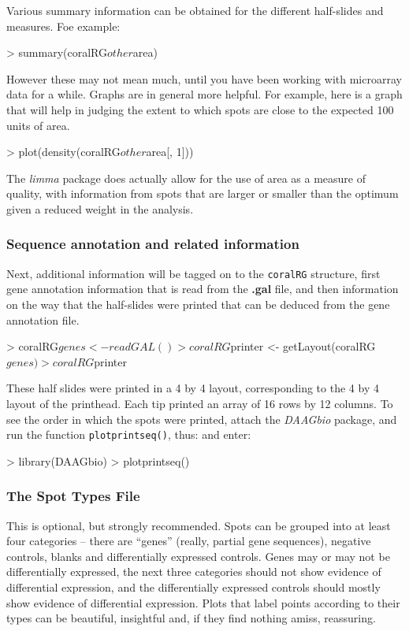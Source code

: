 \documentclass[a4paper,9pt]{article}
\begin{document}
Various summary information can be obtained for the different half-slides and
measures.  Foe example:
\begin{Schunk}
\begin{Sinput}
> summary(coralRG$other$area)
\end{Sinput}
\end{Schunk}
However these may not mean much, until you have been working with
microarray data for a while.  Graphs are in general more helpful.
For example, here is a graph that will help in judging the extent to
which spots are close to the expected 100 units of area.
\begin{Schunk}
\begin{Sinput}
> plot(density(coralRG$other$area[, 1]))
\end{Sinput}
\end{Schunk}
The \textit{limma} package does actually allow for the use of area
as a measure of quality, with information from spots that are larger
or smaller than the optimum given a reduced weight in the analysis.

\subsubsection*{Sequence annotation and related information}

Next, additional information will be tagged on to the \texttt{coralRG}
structure, first gene annotation information that is read from the
\textbf{.gal} file, and then information on the way that the
half-slides were printed that can be deduced from the gene annotation file.
\begin{Schunk}
\begin{Sinput}
> coralRG$genes <- readGAL()
> coralRG$printer <- getLayout(coralRG$genes)
> coralRG$printer
\end{Sinput}
\end{Schunk}
These half slides were printed in a 4 by 4 layout, corresponding to the
4 by 4 layout of the printhead.  Each tip printed an array of 16 rows
by 12 columns.  To see the order in which the spots were printed,
attach the \textit{DAAGbio} package, and run the function 
\texttt{plotprintseq()}, thus:
and enter:
\begin{Schunk}
\begin{Sinput}
> library(DAAGbio)
> plotprintseq()
\end{Sinput}
\end{Schunk}


\subsubsection*{The Spot Types File}
This is optional, but strongly recommended.  Spots can be grouped into
at least four categories -- there are ``genes'' (really, partial gene
sequences), negative controls, blanks and differentially expressed
controls.  Genes may or may not be differentially expressed, the next
three categories should not show evidence of differential expression,
and the differentially expressed controls should mostly show evidence
of differential expression.  Plots that label points according to
their types can be beautiful, insightful and, if they find nothing
amiss, reassuring.
\end{document}
